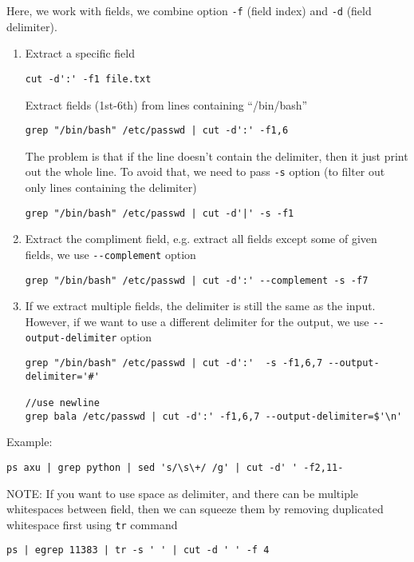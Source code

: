 Here, we work with fields, we combine option \verb!-f! (field index) and
\verb!-d! (field delimiter).
\begin{enumerate}
   \item Extract a specific field
\begin{verbatim}
cut -d':' -f1 file.txt
\end{verbatim}   

   Extract fields (1st-6th) from lines containing ``/bin/bash''
\begin{verbatim}
grep "/bin/bash" /etc/passwd | cut -d':' -f1,6
\end{verbatim}   

The problem is that if the line doesn't contain the delimiter, then it just
print out the whole line. To avoid that, we need to pass \verb!-s! option (to
filter out only lines containing the delimiter)
\begin{verbatim}
grep "/bin/bash" /etc/passwd | cut -d'|' -s -f1
\end{verbatim}

   \item Extract the compliment field, e.g. extract all fields except some of
   given fields, we use \verb!--complement! option
\begin{verbatim}
grep "/bin/bash" /etc/passwd | cut -d':' --complement -s -f7
\end{verbatim}   


   \item If we extract multiple fields, the delimiter is still the same as the
   input. However, if we want to use a different delimiter for the output, we
   use \verb!--output-delimiter! option
\begin{verbatim}
grep "/bin/bash" /etc/passwd | cut -d':'  -s -f1,6,7 --output-delimiter='#'

//use newline
grep bala /etc/passwd | cut -d':' -f1,6,7 --output-delimiter=$'\n'
\end{verbatim}   

\end{enumerate}

Example:
\begin{verbatim}
ps axu | grep python | sed 's/\s\+/ /g' | cut -d' ' -f2,11-
\end{verbatim}


NOTE: If you want to use space as delimiter, and there can be multiple
whitespaces between field, then we can squeeze them by removing duplicated
whitespace first using \verb!tr! command
\begin{verbatim}
ps | egrep 11383 | tr -s ' ' | cut -d ' ' -f 4
\end{verbatim}


